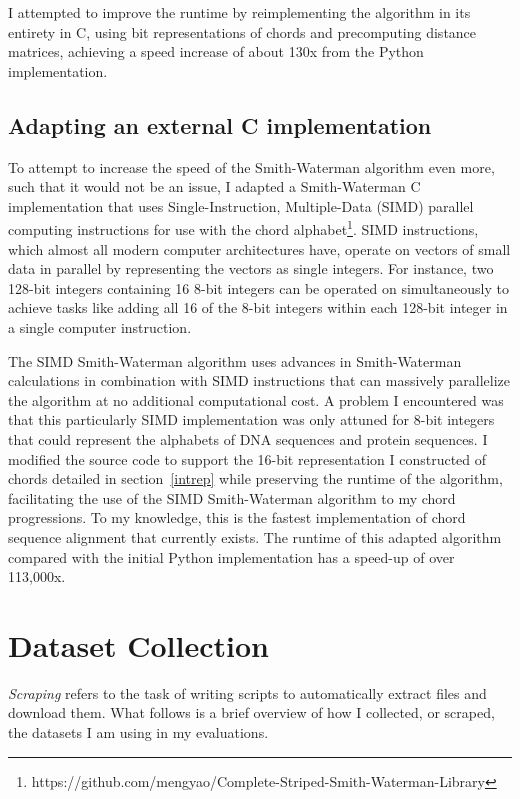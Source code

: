 I attempted to improve the runtime by reimplementing the algorithm in its entirety in C, using bit representations of chords and precomputing distance matrices, achieving a speed increase of about 130x from the Python implementation.

\subsection{Adapting an external C implementation}

To attempt to increase the speed of the Smith-Waterman algorithm even more, such that it would not be an issue, I adapted a Smith-Waterman C implementation that uses Single-Instruction, Multiple-Data (SIMD) parallel computing instructions for use with the chord alphabet\cite{Zhao_2013}\footnote{https://github.com/mengyao/Complete-Striped-Smith-Waterman-Library}. SIMD instructions, which almost all modern computer architectures have, operate on vectors of small data in parallel by representing the vectors as single integers. For instance, two 128-bit integers containing 16 8-bit integers can be operated on simultaneously to achieve tasks like adding all 16 of the 8-bit integers within each 128-bit integer in a single computer instruction.

The SIMD Smith-Waterman algorithm uses advances in Smith-Waterman calculations\cite{chao1992aligning} in combination with SIMD instructions that can massively parallelize the algorithm at no additional computational cost. A problem I encountered was that this particularly SIMD implementation was only attuned for 8-bit integers that could represent the alphabets of DNA sequences and protein sequences. I modified the source code to support the 16-bit representation I constructed of chords detailed in section~\ref{intrep} while preserving the runtime of the algorithm, facilitating the use of the SIMD Smith-Waterman algorithm to my chord progressions. To my knowledge, this is the fastest implementation of chord sequence alignment that currently exists. The runtime of this adapted algorithm compared with the initial Python implementation has a speed-up of over 113,000x.

\section{Dataset Collection}

\textit{Scraping} refers to the task of writing scripts to automatically extract files and download them. What follows is a brief overview of how I collected, or scraped, the datasets I am using in my evaluations.

